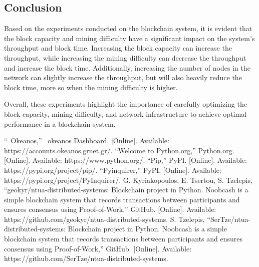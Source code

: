 \documentclass[conference]{IEEEtran}
\begin{document}
\subsection{Conclusion}

Based on the experiments conducted on the blockchain system, it is evident that the block capacity and mining difficulty have a significant impact on the system's throughput and block time. Increasing the block capacity can increase the throughput, while increasing the mining difficulty can decrease the throughput and increase the block time. Additionally, increasing the number of nodes in the network can slightly increase the throughput, but will also heavily reduce the block time, more so when the mining difficulty is higher.

Overall, these experiments highlight the importance of carefully optimizing the block capacity, mining difficulty, and network infrastructure to achieve optimal performance in a blockchain system.

\begin{thebibliography}{00}
 “~Okeanos,” ~okeanos Dashboard. [Online]. Available: https://accounts.okeanos.grnet.gr/.
 “Welcome to Python.org,” Python.org. [Online]. Available: https://www.python.org/.
 “Pip,” PyPI. [Online]. Available: https://pypi.org/project/pip/.
 “Pyinquirer,” PyPI. [Online]. Available: https://pypi.org/project/PyInquirer/.
 G. Kyriakopoulos, E. Tsertou, S. Tzelepis, “geokyr/ntua-distributed-systems: Blockchain project in Python. Noobcash is a simple blockchain system that records transactions between participants and ensures consensus using Proof-of-Work,” GitHub. [Online]. Available: https://github.com/geokyr/ntua-distributed-systems.
 S. Tzelepis, “SerTze/ntua-distributed-systems: Blockchain project in Python. Noobcash is a simple blockchain system that records transactions between participants and ensures consensus using Proof-of-Work,” GitHub. [Online]. Available: https://github.com/SerTze/ntua-distributed-systems.
\end{thebibliography}
\end{document}
